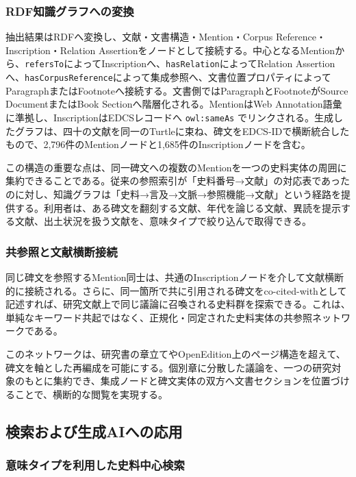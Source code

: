 \subsubsection{RDF知識グラフへの変換}

抽出結果はRDFへ変換し、文献・文書構造・Mention・Corpus Reference・Inscription・Relation Assertionをノードとして接続する。中心となるMentionから、\texttt{refersTo}によってInscriptionへ、\texttt{hasRelation}によってRelation Assertionへ、\texttt{hasCorpusReference}によって集成参照へ、文書位置プロパティによってParagraphまたはFootnoteへ接続する。文書側ではParagraphとFootnoteがSource DocumentまたはBook Sectionへ階層化される。MentionはWeb Annotation語彙に準拠し、InscriptionはEDCSレコードへ \texttt{owl:sameAs} でリンクされる。生成したグラフは、四十の文献を同一のTurtleに束ね、碑文をEDCS-IDで横断統合したもので、2,796件のMentionノードと1,685件のInscriptionノードを含む。

この構造の重要な点は、同一碑文への複数のMentionを一つの史料実体の周囲に集約できることである。従来の参照索引が「史料番号→文献」の対応表であったのに対し、知識グラフは「史料→言及→文脈→参照機能→文献」という経路を提供する。利用者は、ある碑文を翻刻する文献、年代を論じる文献、異読を提示する文献、出土状況を扱う文献を、意味タイプで絞り込んで取得できる。

\subsubsection{共参照と文献横断接続}

同じ碑文を参照するMention同士は、共通のInscriptionノードを介して文献横断的に接続される。さらに、同一箇所で共に引用される碑文をco-cited-withとして記述すれば、研究文献上で同じ議論に召喚される史料群を探索できる。これは、単純なキーワード共起ではなく、正規化・同定された史料実体の共参照ネットワークである。

このネットワークは、研究書の章立てやOpenEdition上のページ構造を超えて、碑文を軸とした再編成を可能にする。個別章に分散した議論を、一つの研究対象のもとに集約でき、集成ノードと碑文実体の双方へ文書セクションを位置づけることで、横断的な閲覧を実現する。

\subsection{検索および生成AIへの応用}

\subsubsection{意味タイプを利用した史料中心検索}

